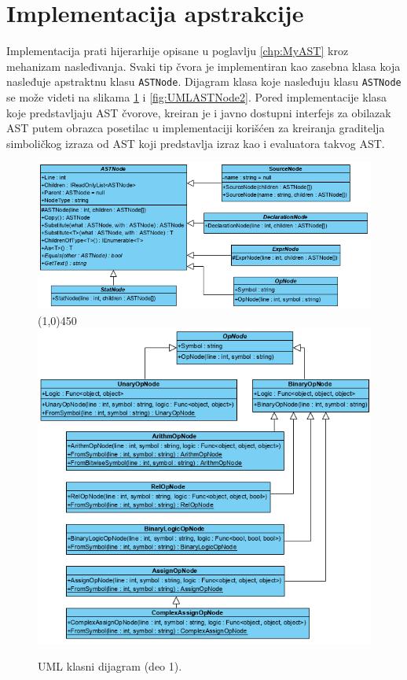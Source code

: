 \section{Implementacija apstrakcije}
\label{sec:ImplementationMyAST}

Implementacija prati hijerarhije opisane u poglavlju \ref{chp:MyAST} kroz mehanizam nasleđivanja. Svaki tip čvora je implementiran kao zasebna klasa koja nasleđuje apstraktnu klasu \texttt{ASTNode}. Dijagram klasa koje nasleđuju klasu \texttt{ASTNode} se može videti na slikama \ref{fig:UMLASTNode1} i \ref{fig:UMLASTNode2}. Pored implementacije klasa koje predstavljaju AST čvorove, kreiran je i javno dostupni interfejs za obilazak AST putem obrazca posetilac u implementaciji korišćen za kreiranja graditelja simboličkog izraza od AST koji predstavlja izraz kao i evaluatora takvog AST.

\begin{figure}[h!]
\centering
\includegraphics[scale=0.7]{images/uml/ASTNode.png}
\line(1,0){450}\\
\includegraphics[scale=0.7]{images/uml/OperatorNode.png}
\caption{UML klasni dijagram (deo 1).}
\label{fig:UMLASTNode1}
\end{figure}

